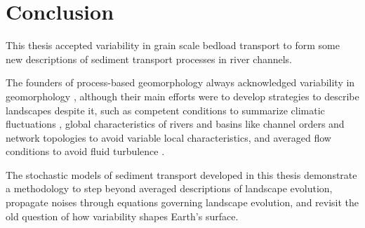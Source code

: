 \section{Conclusion}

This thesis accepted variability in grain scale bedload transport to form some new descriptions of sediment transport processes in river channels.

The founders of process-based geomorphology always acknowledged variability in geomorphology \citep{Horton1945,Strahler1952,Langbein1964}, although their main efforts were to develop strategies to describe landscapes despite it, such as competent conditions to summarize climatic fluctuations \citep{Wolman1959,Wolman1978}, global characteristics of rivers and basins like channel orders and network topologies to avoid variable local characteristics, and averaged flow conditions to avoid fluid turbulence \citep{MeyerPeter1948,Bagnold1954}.

The stochastic models of sediment transport developed in this thesis demonstrate a methodology to step beyond averaged descriptions of landscape evolution, propagate noises through equations governing landscape evolution, and revisit the old question of how variability shapes Earth's surface.
